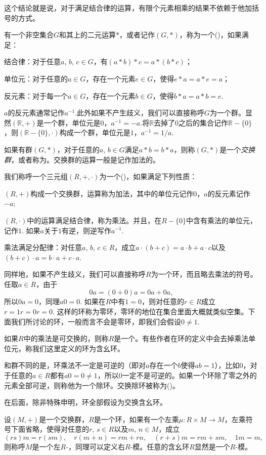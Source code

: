 这个结论就是说，对于满足结合律的运算，有限个元素相乘的结果不依赖于他加括号的方式。

\para 有一个非空集合$G$和其上的二元运算$*$，或者记作$(G,*)$，称为一个()，如果满足：

结合律：对于任意$a$, $b$, $c\in G$，有$(a*b)*c=a*(b*c)$；

单位元：对于任意的$a\in G$，存在一个元素$e\in G$，使得$e*a=a*e=a$；

反元素：对于每一个$a\in G$，存在一个元素$b\in G$，使得$b*a=a*b=e$.

$a$的反元素通常记作$a^{-1}$.此外如果不产生歧义，我们可以直接称呼$G$为一个群。显然$(\mathbb{R},+)$是一个群，单位元是0，$a^{-1}=-a$.将$\mathbb{R}$去掉了$0$之后的集合记作$\mathbb{R}-\{0\}$，则$(\mathbb{R}-\{0\},\cdot)$构成一个群，单位元是$1$，$a^{-1}=1/a$.

如果有群$(G,*)$，对于任意的$a$, $b\in G$满足$a*b=b*a$，则称$(G,*)$是一个\textit{交换群}，或者称为。交换群的运算一般是记作加法的。

\para 我们称呼一个三元组$(R,+,\cdot)$为一个()，如果满足下列性质：

 $(R,+)$构成一个交换群，运算称为加法，其中的单位元记作$0$，$a$的反元素记作$-a$;

 $(R,\cdot)$中的运算满足结合律，称为乘法。并且，在$R-\{0\}$中含有乘法的单位元，记作$1$. 如果$a$关于$1$有逆，则逆写作$a^{-1}$.

 乘法满足分配律：对任意$a$, $b$, $c \in R$，成立$a\cdot(b+c)=a\cdot b+a\cdot c$以及$(b+c)\cdot a=b\cdot a+c\cdot a$.

同样地，如果不产生歧义，我们可以直接称呼$R$为一个环，而且略去乘法的符号。任取$a\in R$，由于
\[
	0a=(0+0)a=0a+0a,
\]
所以$0a=0$，同理$a0=0$. 如果在$R$中有$1=0$，则对任意的$r\in R$成立$r=1r=0r=0$. 这样的环称为零环，零环的地位在集合里面大概就类似空集。下面我们所讨论的环，一般而言不会是零环，即我们会假设$0\neq 1$.

如果$R$中的乘法是可交换的，则称$R$是一个。有些作者在环的定义中会去掉乘法单位元，称我们这里定义的环为含幺环。

和群不同的是，环乘法不一定是可逆的（即对$a$存在一个$b$使得$ab=1$），比如$0$，对于任意的$a\in R$都有$a0=0\neq 1$，所以$0$一定不是可逆的。如果一个环除了零之外的元素全部可逆，则称他为一个除环。交换除环被称为()。

在后面，除非特殊申明，环全部假设为交换含幺环。

\para 设$(M,+)$是一个交换群，$R$是一个环，如果有一个左乘$\mu:R\times M\to M$，左乘符号下面省略，使得对任意的$r$, $s\in R$以及$m$, $n\in M$，成立
\[
	(rs)m=r(sm),\quad r(m+n)=rm+rn,\quad (r+s)m=rm+sm,\quad 1m=m,
\]
则称呼$M$是一个左$R$-，同理可以定义右$R$-模。任意的含幺环$R$显然是一个$R$-模。

